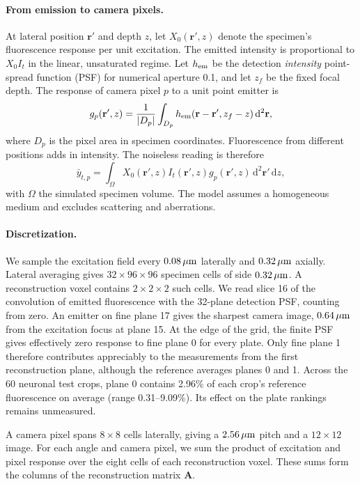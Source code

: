 \paragraph{From emission to camera pixels.}
At lateral position $\mathbf r'$ and depth $z$, let $X_0(\mathbf r',z)$ denote the specimen's fluorescence response per unit excitation. The emitted intensity is proportional to $X_0 I_t$ in the linear, unsaturated regime. Let $h_{\rm em}$ be the detection \emph{intensity} point-spread function (PSF) for numerical aperture 0.1, and let $z_f$ be the fixed focal depth. The response of camera pixel $p$ to a unit point emitter is
\begin{equation}
g_p(\mathbf r',z)=\frac{1}{|D_p|}\int_{D_p}
 h_{\rm em}(\mathbf r-\mathbf r',z_f-z)\,\mathrm d^2\mathbf r ,
\end{equation}
where $D_p$ is the pixel area in specimen coordinates. Fluorescence from different positions adds in intensity. The noiseless reading is therefore
\begin{equation}
\bar y_{t,p}=\int_\Omega X_0(\mathbf r',z) I_t(\mathbf r',z)
g_p(\mathbf r',z)\,\mathrm d^2\mathbf r'\,\mathrm dz ,
\label{eq:s:forward}
\end{equation}
with $\Omega$ the simulated specimen volume. The model assumes a homogeneous medium and excludes scattering and aberrations.

\paragraph{Discretization.}
We sample the excitation field every $0.08\,\mu\mathrm{m}$ laterally and $0.32\,\mu\mathrm{m}$ axially. Lateral averaging gives $32\times96\times96$ specimen cells of side $0.32\,\mu\mathrm{m}$. A reconstruction voxel contains $2\times2\times2$ such cells. We read slice 16 of the convolution of emitted fluorescence with the 32-plane detection PSF, counting from zero. An emitter on fine plane 17 gives the sharpest camera image, $0.64\,\mu\mathrm{m}$ from the excitation focus at plane 15. At the edge of the grid, the finite PSF gives effectively zero response to fine plane 0 for every plate. Only fine plane 1 therefore contributes appreciably to the measurements from the first reconstruction plane, although the reference averages planes 0 and 1. Across the 60 neuronal test crops, plane 0 contains 2.96\% of each crop's reference fluorescence on average (range 0.31--9.09\%). Its effect on the plate rankings remains unmeasured.

A camera pixel spans $8\times8$ cells laterally, giving a $2.56\,\mu\mathrm{m}$ pitch and a $12\times12$ image. For each angle and camera pixel, we sum the product of excitation and pixel response over the eight cells of each reconstruction voxel. These sums form the columns of the reconstruction matrix $\mathbf A$.

